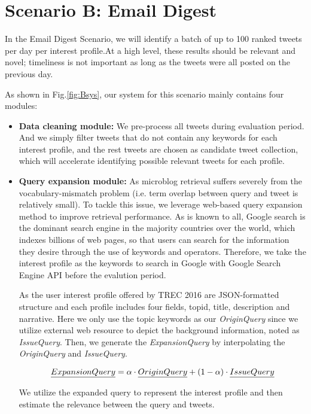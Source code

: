\section{Scenario B: Email Digest}
In the Email Digest Scenario, we will identify a batch of up to 100 ranked tweets per day per interest profile.At a high level, these results should be relevant and novel; timeliness is not important as long as the tweets were all posted on the previous day.

As shown in Fig.\ref{fig:Bsys}, our system for this scenario mainly contains four modules:

\begin{itemize}
\item \textbf{Data cleaning module:} We pre-process all tweets during evaluation period. And we simply filter tweets that do not contain any keywords for each interest profile, and the rest tweets are chosen as candidate tweet collection, which will accelerate identifying possible relevant tweets for each profile.

\item \textbf{Query expansion module:} As microblog retrieval suffers severely from the
vocabulary-mismatch problem (i.e. term overlap between query and tweet is relatively small). To tackle this issue, we leverage web-based query expansion method to improve retrieval performance. As is known to all, Google search is the dominant search engine in the majority countries over the world, which indexes billions\cite{arlington2008google} of web pages, so that users can search for the information they desire through the use of keywords and operators. Therefore, we take the interest profile as the keywords to search in Google with Google Search Engine API before the evalution period.


As the user interest profile offered by TREC 2016 are JSON-formatted structure and each profile includes four fields, topid, title, description and narrative. Here we only use the topic keywords as our \emph{OriginQuery} since we utilize external web resource to depict the background information, noted as \emph{IssueQuery}. Then, we generate the \emph{ExpansionQuery} by interpolating the \emph{OriginQuery} and \emph{IssueQuery}.

\begin{equation}
\label{equ:merge}
\emph{ExpansionQuery} = \alpha \cdot \emph{OriginQuery} + (1-\alpha) \cdot \emph{IssueQuery}
\end{equation}

We utilize the expanded query to represent the interest profile and then estimate the relevance between the query and tweets.


\end{itemize}
